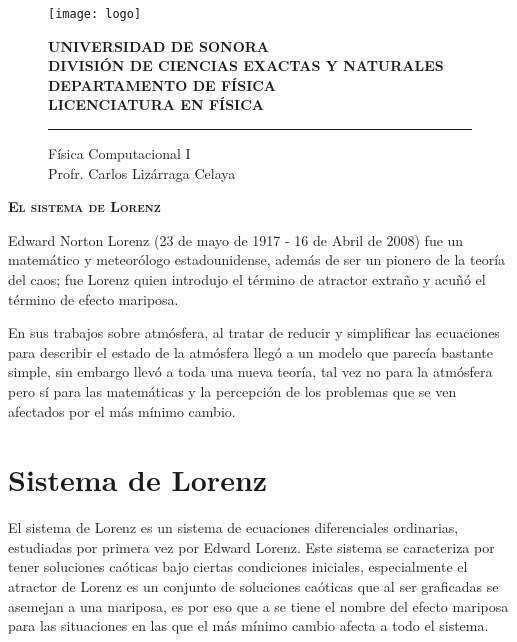 
\date{15 de mayo del 2017}


\begin{titlepage}

    \begin{figure}[ht!]
    \centering
    \texttt{[image: logo]}
    
    \textbf{UNIVERSIDAD DE SONORA \\ DIVISIÓN DE CIENCIAS EXACTAS Y NATURALES \\ DEPARTAMENTO DE FÍSICA \\ LICENCIATURA EN FÍSICA}
	\maketitle
    \hrule \bigskip
    \large{Física Computacional I}\\
	Profr. Carlos Lizárraga Celaya
    \end{figure}
\thispagestyle{empty}

\end{titlepage}

\newpage

\begin{center}
\huge{\textbf{\textsc{El sistema de Lorenz}}}
\end{center}
\noindent Edward Norton Lorenz (23 de mayo de 1917 - 16 de Abril de 2008) fue un matemático y meteorólogo estadounidense, además de ser un pionero de la teoría del caos; fue Lorenz quien introdujo el término de atractor extraño y acuñó el término de efecto mariposa.\cite{lorenz}

En sus trabajos sobre atmósfera, al tratar de reducir y simplificar las ecuaciones para describir el estado de la atmósfera llegó a un modelo que parecía bastante simple, sin embargo llevó a toda una nueva teoría, tal vez no para la atmósfera pero sí para las matemáticas y la percepción de los problemas que se ven afectados por el más mínimo cambio.

\section{Sistema de Lorenz}
\noindent El sistema de Lorenz es un sistema de ecuaciones diferenciales ordinarias, estudiadas por primera vez por Edward Lorenz. Este sistema se caracteriza por tener soluciones caóticas bajo ciertas condiciones iniciales, especialmente el atractor de Lorenz es un conjunto de soluciones caóticas que al ser graficadas se asemejan a una mariposa, es por eso que a se tiene el nombre del efecto mariposa para las situaciones en las que el más mínimo cambio afecta a todo el sistema.\cite{video}

